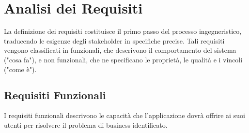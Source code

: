 \documentclass[12pt,a4paper,openright,twoside]{book}
\begin{document}
\section{Analisi dei Requisiti}
\label{sec:analisi_requisiti}
La definizione dei requisiti costituisce il primo passo del processo ingegneristico, traducendo le esigenze degli stakeholder in specifiche precise. Tali requisiti vengono classificati in funzionali, che descrivono il comportamento del sistema ("cosa fa"), e non funzionali, che ne specificano le proprietà, le qualità e i vincoli ("come è").

\subsection{Requisiti Funzionali}
\label{subsec:req_funzionali}
I requisiti funzionali descrivono le capacità che l'applicazione dovrà offrire ai suoi utenti per risolvere il problema di business identificato.
\end{document}
